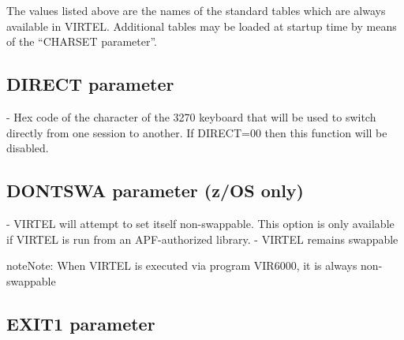 \documentclass[letterpaper,10pt,english]{sphinxmanual}
\begin{document}
The values listed above are the names of the standard tables which are always available in VIRTEL. Additional tables
may be loaded at startup time by means of the “CHARSET parameter”.


\subsection{DIRECT parameter}
\label{\detokenize{Installation_Guide:index-52}}\label{\detokenize{Installation_Guide:direct-parameter}}
\begin{sphinxVerbatim}[commandchars=\\\{\}]
  
\end{sphinxVerbatim}

 - Hex code of the character of the 3270 keyboard that will be used to switch directly from one session to another. If DIRECT=00 then this function will be disabled.


\subsection{DONTSWA parameter (z/OS only)}
\label{\detokenize{Installation_Guide:index-53}}\label{\detokenize{Installation_Guide:dontswa-parameter-z-os-only}}
\begin{sphinxVerbatim}[commandchars=\\\{\}]
 
\end{sphinxVerbatim}

 - VIRTEL will attempt to set itself non-swappable. This option is only available if VIRTEL is run from an APF-authorized library.
 - VIRTEL remains swappable

\begin{sphinxadmonition}{note}{Note:}
When VIRTEL is executed via program VIR6000, it is always non-swappable
\end{sphinxadmonition}


\subsection{EXIT1 parameter}
\label{\detokenize{Installation_Guide:exit1-parameter}}\label{\detokenize{Installation_Guide:index-54}}
\begin{sphinxVerbatim}[commandchars=\\\{\}]
 
\end{sphinxVerbatim}
\end{document}
